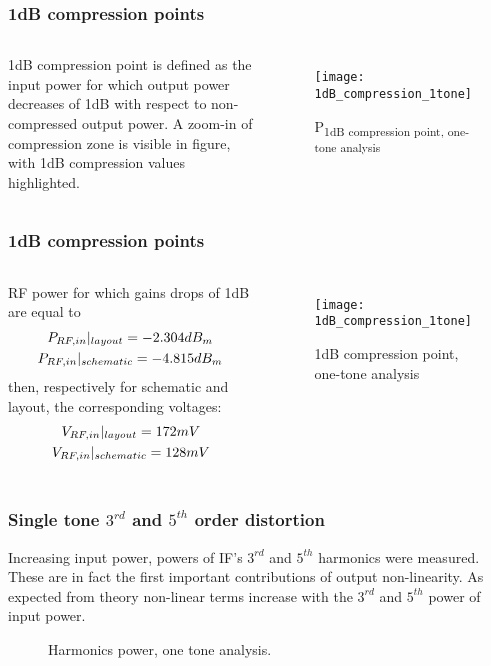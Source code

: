 \begin{frame}
\frametitle{1dB compression points}
\begin{columns}
	1dB compression point is defined as the input power for which output power decreases of 1dB with respect to non-compressed output power. A zoom-in of compression zone is visible in figure, with 1dB compression values highlighted.
	\begin{figure}[H] 
		\centering
		\texttt{[image: 1dB\_compression\_1tone]}
		\caption{ P\textsubscript{1dB compression point, one-tone analysis}}
		\label{fig:PinPout1T_1dBCp}
	\end{figure}
	\end{columns}
\end{frame}

\begin{frame}
\frametitle{1dB compression points}
\begin{columns}
	RF power for which gains drops of 1dB are equal to 
	\begin{gather}
	P_{RF,in}|_{layout}=-2.304dB_{m} \notag \\
	P_{RF,in}|_{schematic}=-4.815dB_{m} \notag
	\end{gather}
	then, respectively for schematic and layout, the corresponding voltages:
	\begin{gather}
	V_{RF,in}|_{layout}=172mV \notag \\
	V_{RF,in}|_{schematic}=128mV \notag
	\end{gather}
	
	\begin{figure}[H] 
		\centering
		\texttt{[image: 1dB\_compression\_1tone]}
		\caption{1dB compression point, one-tone analysis}
		\label{fig:PinPout1T_1dBc}
	\end{figure}
\end{columns}
\end{frame}

\begin{frame}
\frametitle{Single tone $3^{rd}$ and $5^{th}$ order distortion}
	Increasing input power, powers of IF's $3^{rd}$ and $5^{th}$ harmonics were measured. These are in fact the first important contributions of output non-linearity. As expected from theory non-linear terms increase with the $3^{rd}$ and $5^{th}$ power of input power.
	\begin{figure}[H] 
		\centering
		\caption{Harmonics power, one tone analysis.}
		\label{fig:IIP3_1t_schem}
	\end{figure}
\end{frame}

